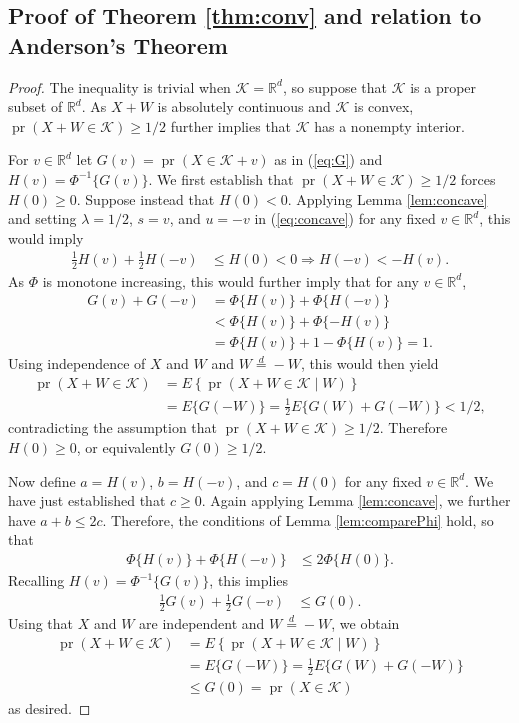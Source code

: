\documentclass[11pt]{article}
\newcommand{\1}{\mathbbm{1}}
\def\pr{{\operatorname{pr}}}
\theoremstyle{plain}
\theoremstyle{definition}
\begin{document}
\subsection{Proof of Theorem \ref{thm:conv} and relation to Anderson's Theorem}
\begin{proof}
The inequality is trivial when $\mathcal{K} = \mathbb{R}^d$, so suppose that $\mathcal{K}$ is a proper subset of $\mathbb{R}^d$. As $X+W$ is absolutely continuous and $\mathcal{K}$ is convex, $\pr(X+W\in \mathcal{K}) \geq 1/2$ further implies that $\mathcal{K}$ has a nonempty interior. 

For $v\in \mathbb{R}^d$ let $G(v) = \pr(X\in \mathcal{K}+v)$ as in (\ref{eq:G}) and $H(v) = \Phi^{-1}\{G(v)\}$. We first establish that $\pr(X+W \in \mathcal{K})\geq 1/2$ forces $H(0)\geq 0$. Suppose instead that $H(0) < 0$. Applying Lemma \ref{lem:concave} and setting $\lambda=1/2$, $s=v$, and $u=-v$ in (\ref{eq:concave}) for any fixed $v\in \mathbb{R}^d$, this would imply
\begin{align*}
\frac{1}{2}H(v) + \frac{1}{2}H(-v) & \leq H(0) < 0 \Rightarrow H(-v) < -H(v).
\end{align*}
As $\Phi$ is monotone increasing, this would further imply that for any $v\in\mathbb{R}^d$,
\begin{align*}
G(v) + G(-v) &= \Phi\{H(v)\} + \Phi\{H(-v)\}\\
& < \Phi\{H(v)\} + \Phi\{-H(v)\}\\& = \Phi\{H(v)\}+1-\Phi\{H(v)\} = 1.
\end{align*}Using independence of $X$ and $W$ and $W\overset{d}{=}-W$, this would then yield
\begin{align*}
    \pr(X+W\in \mathcal{K}) &= E\left\{\pr(X+W\in \mathcal{K}\mid W)\right\}\\
    &= E\{G(-W)\} = \frac{1}{2}E\{G(W)+G(-W)\} < 1/2,
\end{align*}
contradicting the assumption that $\pr(X+W\in \mathcal{K}) \geq 1/2$. Therefore $H(0)\geq 0$, or equivalently $G(0)\geq 1/2$.

Now define $a = H(v)$, $b=H(-v)$, and $c=H(0)$ for any fixed $v\in\mathbb{R}^d$. We have just established that $c\geq 0$. Again applying Lemma \ref{lem:concave}, we further have $a+b\leq 2c$. Therefore, the conditions of Lemma \ref{lem:comparePhi} hold, so that 
\begin{align*}
\Phi\{H(v)\} + \Phi\{H(-v)\} & \leq 2 \Phi\{H(0)\}.
\end{align*}
Recalling $H(v) = \Phi^{-1}\{G(v)\}$, this implies
\begin{align*}
\frac{1}{2}G(v) + \frac{1}{2}G(-v) &\leq G(0).
\end{align*} Using that $X$ and $W$ are independent and $W\overset{d}{=}-W$, we obtain
\begin{align*}
    \pr(X+W\in \mathcal{K}) &= E\left\{\pr(X+W\in \mathcal{K} \mid W)\right\}\\
    &= E\{G(-W)\} = \frac{1}{2}E\{G(W)+G(-W)\}\\
    &\leq G(0) = \pr(X\in \mathcal{K})
\end{align*}
as desired.
\end{proof}
\end{document}
